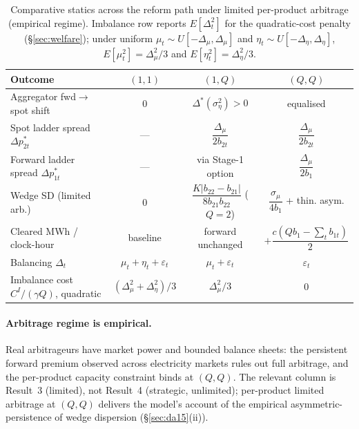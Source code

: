 \documentclass[11pt]{article}
\begin{document}
\begin{table}[h]
\centering
\footnotesize
\caption{Comparative statics across the reform path under limited per-product arbitrage (empirical regime). Imbalance row reports $E[\Delta_t^2]$ for the quadratic-cost penalty (\S\ref{sec:welfare}); under uniform $\mu_t \sim U[-\Delta_\mu, \Delta_\mu]$ and $\eta_t \sim U[-\Delta_\eta, \Delta_\eta]$, $E[\mu_t^2] = \Delta_\mu^2/3$ and $E[\eta_t^2] = \Delta_\eta^2/3$.}
\label{tab:comparative}
\begin{tabular}{p{4.6cm} c c c}
\toprule
Outcome & $(1,1)$ & $(1,Q)$ & $(Q,Q)$ \\
\midrule
Aggregator fwd$\to$spot shift
 & $0$
 & $\Delta^*(\sigma_\eta^2) > 0$
 & equalised \\
Spot ladder spread $\Delta p^*_{2t}$
 & ---
 & $\dfrac{\Delta_\mu}{2 b_{2t}}$
 & $\dfrac{\Delta_\mu}{2 b_{2t}}$ \\
Forward ladder spread $\Delta p^*_{1t}$
 & ---
 & via Stage-1 option
 & $\dfrac{\Delta_\mu}{2 b_1}$ \\
Wedge SD (limited arb.)
 & $0$
 & $\dfrac{K|b_{22}-b_{21}|}{8 b_{21} b_{22}}$ ($Q\!=\!2$)
 & $\dfrac{\sigma_\mu}{4 b_1}$ + thin. asym. \\
Cleared MWh / clock-hour
 & baseline
 & forward unchanged
 & $+\dfrac{c(Q b_1 - \sum_t b_{1t})}{2}$ \\
Balancing $\Delta_t$
 & $\mu_t+\eta_t+\varepsilon_t$
 & $\mu_t+\varepsilon_t$
 & $\varepsilon_t$ \\
Imbalance cost $C^I/(\gamma Q)$, quadratic
 & $(\Delta_\mu^2+\Delta_\eta^2)/3$
 & $\Delta_\mu^2/3$
 & $0$ \\
\bottomrule
\end{tabular}
\end{table}

\paragraph{Arbitrage regime is empirical.} Real arbitrageurs have market power and bounded balance sheets: the persistent forward premium observed across electricity markets rules out full arbitrage, and the per-product capacity constraint binds at $(Q,Q)$. The relevant \citeauthor{ito_reguant_2016} column is Result~3 (limited), not Result~4 (strategic, unlimited); per-product limited arbitrage at $(Q,Q)$ delivers the model's account of the empirical asymmetric-persistence of wedge dispersion (\S\ref{sec:da15}(ii)).
\end{document}
